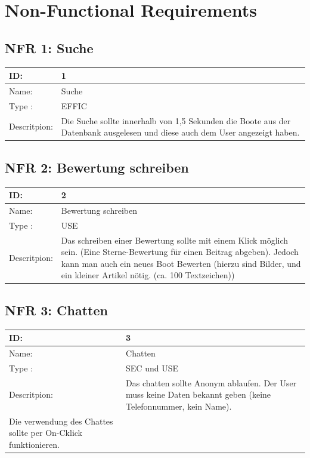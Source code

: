 \documentclass[12pt]{article}
\theoremstyle{definition}
\begin{document}
\section{Non-Functional Requirements}

\subsection{NFR 1: Suche}
\begin{tabular}{|p{.2\linewidth}|p{.65\linewidth}|}
\hline 
ID: & 1 \\ \hline
Name: & Suche \\ \hline
Type	: & EFFIC \\ \hline
Descritpion: &  Die Suche sollte innerhalb von 1,5 Sekunden die Boote aus der Datenbank ausgelesen und diese auch dem User angezeigt haben.\\ \hline
\end{tabular}

\subsection{NFR 2: Bewertung schreiben}
\begin{tabular}{|p{.2\linewidth}|p{.65\linewidth}|}
\hline 
ID: & 2 \\ \hline
Name: & Bewertung schreiben \\ \hline
Type	: & USE \\ \hline
Descritpion: &  Das schreiben einer Bewertung sollte mit einem Klick möglich sein. (Eine Sterne-Bewertung für einen Beitrag abgeben). Jedoch kann man auch ein neues Boot Bewerten (hierzu sind Bilder, und ein kleiner Artikel nötig. (ca. 100 Textzeichen))\\ \hline
\end{tabular}

\subsection{NFR 3: Chatten}
\begin{tabular}{|p{.2\linewidth}|p{.65\linewidth}|}
\hline 
ID: & 3 \\ \hline
Name: & Chatten \\ \hline
Type	: & SEC und USE \\ \hline
Descritpion: &  Das chatten sollte Anonym ablaufen. Der User muss keine Daten bekannt geben (keine Telefonnummer, kein Name). \\Die verwendung des Chattes sollte per On-Cklick funktionieren. \\ \hline
\end{tabular}
\end{document}
